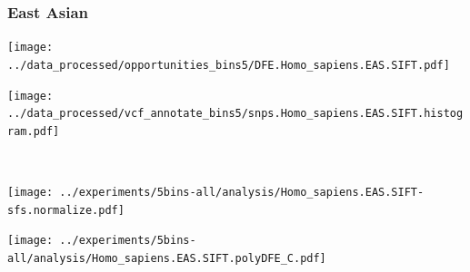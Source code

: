 \subsubsection{East Asian}

\begin{minipage}{0.49\linewidth}
    \texttt{[image: ../data\_processed/opportunities\_bins5/DFE.Homo\_sapiens.EAS.SIFT.pdf]}
\end{minipage}
\begin{minipage}{0.49\linewidth}
    \texttt{[image: ../data\_processed/vcf\_annotate\_bins5/snps.Homo\_sapiens.EAS.SIFT.histogram.pdf]}
\end{minipage}
\\
\begin{minipage}{0.49\linewidth}
    \texttt{[image: ../experiments/5bins-all/analysis/Homo\_sapiens.EAS.SIFT-sfs.normalize.pdf]}
\end{minipage}
\begin{minipage}{0.4\linewidth}
    \texttt{[image: ../experiments/5bins-all/analysis/Homo\_sapiens.EAS.SIFT.polyDFE\_C.pdf]}
\end{minipage}
